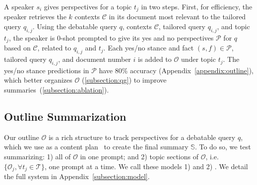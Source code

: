 A speaker $s_i$ gives perspectives for a topic $t_j$ in two steps.
First, for efficiency, the speaker retrieves the $k$ contexts $\mathcal{C}$ in its document most relevant to the tailored query $q_{i, j}$.
Using the debatable query $q$, contexts $\mathcal{C}$, tailored query $q_{i, j}$, and topic $t_j$, the speaker is 0-shot prompted to give its yes and no perspectives $\mathcal{P}$ for $q$ based on $\mathcal{C}$, related to $q_{i, j}$ and $t_j$.
Each yes/no stance and fact $(s, f) \in \mathcal{P}$, tailored query $q_{i, j}$, and document number $i$ is added to $\mathcal{O}$ under topic $t_j$.
The yes/no stance predictions in $\mathcal{P}$ have $80$\% accuracy (Appendix~\ref{appendix:outline}), which better organizes $\mathcal{O}$ (\cref{subsection:qg}) to improve summaries~(\cref{subsection:ablation}).



\subsection{Outline Summarization} \label{subsection:summary}

Our outline $\mathcal{O}$ is a rich structure to track perspectives for a debatable query $q$, which we use as a content plan~\cite{balepur-etal-2023-expository} to create the final summary $\mathbb{S}$.
To do so, we test summarizing: 1) all of $\mathcal{O}$ in one prompt; and 2) topic sections of $\mathcal{O}$, i.e. $\{\mathcal{O}_j, \forall t_j \in \mathcal{T}\}$, one prompt at a time. 
We call these models 1) \modelAll and 2) \modelTopic. We detail the full \model system in Appendix~\ref{subsection:model}.

